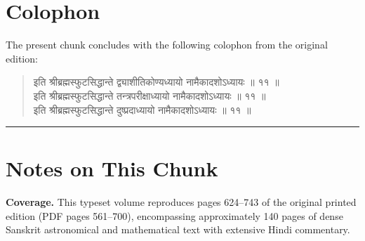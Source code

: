 \documentclass[11pt,a4paper]{article}
\newcommand{\skt}[1]{{\devanagarifont\color{sktcolor} #1}}
\newenvironment{shloka}{%
  \begin{quote}%
  \smallskip%
  \devanagarifont\color{sktcolor}%
}{%
  \smallskip%
  \end{quote}%
}
\begin{document}
\newpage
\section*{Colophon}

The present chunk concludes with the following colophon from the original edition:

\begin{shloka}
\skt{इति श्रीब्रह्मस्फुटसिद्धान्ते द्व्याशीतिकोण्यध्यायो नामैकादशोऽध्यायः ॥ ११ ॥}\\[0.5em]
\skt{इति श्रीब्रह्मस्फुटसिद्धान्ते तन्त्रपरीक्षाध्यायो नामैकादशोऽध्यायः ॥ ११ ॥}\\[0.5em]
\skt{इति श्रीब्रह्मस्फुटसिद्धान्ते दुष्प्रदाध्यायो नामैकादशोऽध्यायः ॥ ११ ॥}
\end{shloka}

\vspace{1cm}

\noindent\rule{\textwidth}{0.4pt}

\section*{Notes on This Chunk}

\textbf{Coverage.} This typeset volume reproduces pages 624--743 of the original printed edition (PDF pages 561--700), encompassing approximately 140 pages of dense Sanskrit astronomical and mathematical text with extensive Hindi commentary.
\end{document}
